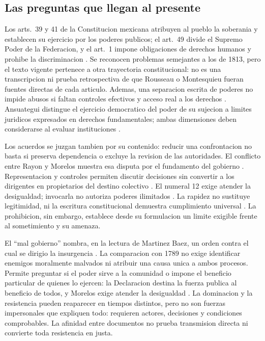 \documentclass[spanish,letterpaper,oneside]{article}
\begin{document}
\subsection{Las preguntas que llegan al presente}

Los arts.~39 y 41 de la Constitucion mexicana atribuyen al pueblo la
soberania y establecen su ejercicio por los poderes publicos; el
art.~49 divide el Supremo Poder de la Federacion, y el art.~1 impone
obligaciones de derechos humanos y prohibe la discriminacion
\citep{cpeum2026S2}. Se reconocen problemas semejantes a los de
1813, pero el texto vigente pertenece a otra trayectoria constitucional:
no es una transcripcion ni prueba retrospectiva de que Rousseau o
Montesquieu fueran fuentes directas de cada articulo. Ademas, una
separacion escrita de poderes no impide abusos si faltan controles
efectivos y acceso real a los derechos \citep{garciaRicci2011}.
Ansuategui distingue el ejercicio democratico del poder de su
sujecion a limites juridicos expresados en derechos fundamentales;
ambas dimensiones deben considerarse al evaluar instituciones
\citep[p.~31]{ansuategui2013}.

Los acuerdos se juzgan tambien por su contenido: reducir una
confrontacion no basta si preserva dependencia o excluye la revision
de las autoridades. El conflicto entre Rayon y Morelos muestra esa
disputa por el fundamento del gobierno
\citep[pp.~49--54]{rayon2021,morelosObservaciones2021}.
Representacion y controles permiten discutir decisiones sin convertir
a los dirigentes en propietarios del destino colectivo
\citep{morelosReglamento2021,campoy2017}. El numeral 12 exige atender
la desigualdad; invocarla no autoriza poderes ilimitados
\citep{morelos2020,ansuategui2013}. La rapidez no sustituye legitimidad,
ni la escritura constitucional demuestra cumplimiento universal
\citep{garciaRicci2011}. La prohibicion, sin embargo, establece desde
su formulacion un limite exigible frente al sometimiento y su amenaza.

El ``mal gobierno'' nombra, en la lectura de Martinez Baez, un orden
contra el cual se dirigio la insurgencia \citep[p.~209]{martinezBaez2021}.
La comparacion con 1789 no exige identificar enemigos moralmente
malvados ni atribuir una causa unica a ambos procesos. Permite preguntar
si el poder sirve a la comunidad o impone el beneficio particular de
quienes lo ejercen: la Declaracion destina la fuerza publica al beneficio
de todos, y Morelos exige atender la desigualdad
\citep[art.~12]{francia1789}\citep[num.~12]{morelos2020}.
La dominacion y la resistencia pueden reaparecer en tiempos distintos,
pero no son fuerzas impersonales que expliquen todo: requieren actores,
decisiones y condiciones comprobables. La afinidad entre documentos
no prueba transmision directa ni convierte toda resistencia en justa.
\end{document}

